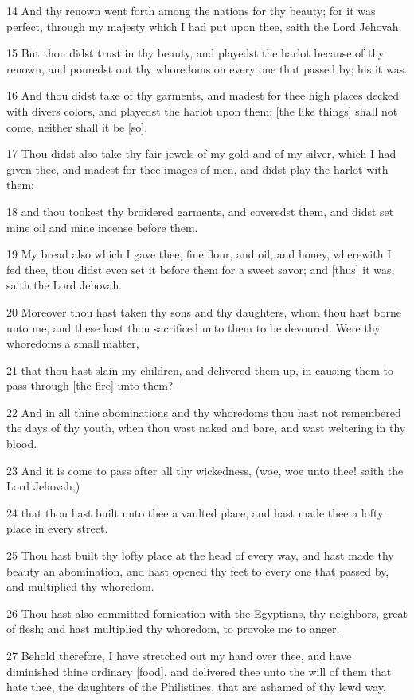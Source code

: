 \par 14 And thy renown went forth among the nations for thy beauty; for it was perfect, through my majesty which I had put upon thee, saith the Lord Jehovah.
\par 15 But thou didst trust in thy beauty, and playedst the harlot because of thy renown, and pouredst out thy whoredoms on every one that passed by; his it was.
\par 16 And thou didst take of thy garments, and madest for thee high places decked with divers colors, and playedst the harlot upon them: [the like things] shall not come, neither shall it be [so].
\par 17 Thou didst also take thy fair jewels of my gold and of my silver, which I had given thee, and madest for thee images of men, and didst play the harlot with them;
\par 18 and thou tookest thy broidered garments, and coveredst them, and didst set mine oil and mine incense before them.
\par 19 My bread also which I gave thee, fine flour, and oil, and honey, wherewith I fed thee, thou didst even set it before them for a sweet savor; and [thus] it was, saith the Lord Jehovah.
\par 20 Moreover thou hast taken thy sons and thy daughters, whom thou hast borne unto me, and these hast thou sacrificed unto them to be devoured. Were thy whoredoms a small matter,
\par 21 that thou hast slain my children, and delivered them up, in causing them to pass through [the fire] unto them?
\par 22 And in all thine abominations and thy whoredoms thou hast not remembered the days of thy youth, when thou wast naked and bare, and wast weltering in thy blood.
\par 23 And it is come to pass after all thy wickedness, (woe, woe unto thee! saith the Lord Jehovah,)
\par 24 that thou hast built unto thee a vaulted place, and hast made thee a lofty place in every street.
\par 25 Thou hast built thy lofty place at the head of every way, and hast made thy beauty an abomination, and hast opened thy feet to every one that passed by, and multiplied thy whoredom.
\par 26 Thou hast also committed fornication with the Egyptians, thy neighbors, great of flesh; and hast multiplied thy whoredom, to provoke me to anger.
\par 27 Behold therefore, I have stretched out my hand over thee, and have diminished thine ordinary [food], and delivered thee unto the will of them that hate thee, the daughters of the Philistines, that are ashamed of thy lewd way.
